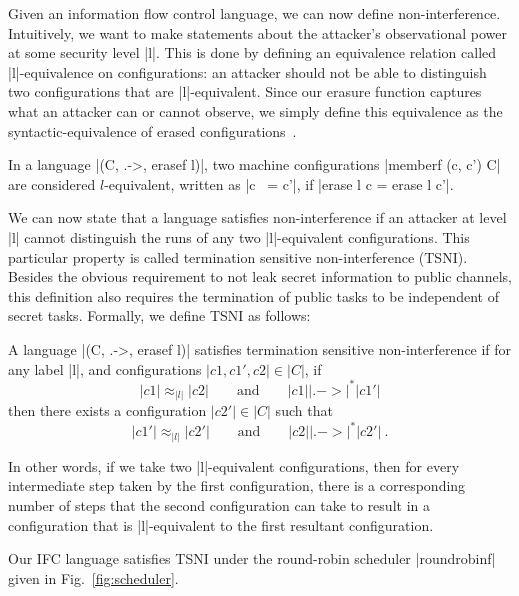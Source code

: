 Given an information flow control language, we can now define non-interference.
Intuitively, we want to make statements about the attacker's observational
power at some security level |l|.  This is done by defining an equivalence
relation called |l|-equivalence on configurations: an attacker should
not be able to distinguish two configurations that are |l|-equivalent.
%
Since our erasure function captures what an attacker can or cannot observe, we simply define this
equivalence as the syntactic-equivalence of erased configurations~\cite{stefan:addressing-covert}.
%
\begin{definition}[|l|-equivalence]
    In a language |(C, .->, erasef l)|, two machine configurations
    |memberf (c, c') C| are considered $l$-equivalent, written as |c ~= c'|,
    if |erase l c = erase l c'|.
\end{definition}
%

We can now state that a language satisfies non-interference if an
attacker at level |l| cannot distinguish the runs of any two |l|-equivalent
configurations.
%
This particular property is called termination sensitive non-interference
(TSNI).  Besides the obvious requirement to not leak secret information
to public channels, this definition also requires the termination
of public tasks to be independent of secret tasks.
%
Formally, we define TSNI as follows:

\begin{definition}
  A language |(C, .->, erasef l)| satisfies termination
  sensitive non-interference if for any label |l|, and configurations
  $|c1, c1', c2|\in|C|$, if
  \begin{equation} \label{eq:tsni-lhs}
    |c1| \approx_{|l|} |c2|
    \qquad \text{and} \qquad
    |c1| |.->|^* |c1'|
  \end{equation}
  then there exists a configuration $|c2'|\in|C|$ such that
  \begin{equation} \label{eq:tsni-rhs}
    |c1'| \approx_{|l|} |c2'|
     \qquad \text{and} \qquad
    |c2| |.->|^* |c2'|
    \ \text{.}
  \end{equation}
\end{definition}
%
In other words, if we take two |l|-equivalent configurations, then for every
intermediate step taken by the first configuration, there is a corresponding
number of steps that the second configuration can take to result in a
configuration that is |l|-equivalent to the first resultant configuration.


Our IFC language satisfies TSNI %
%
under the round-robin scheduler
|roundrobinf| given in Fig.~\ref{fig:scheduler}.

